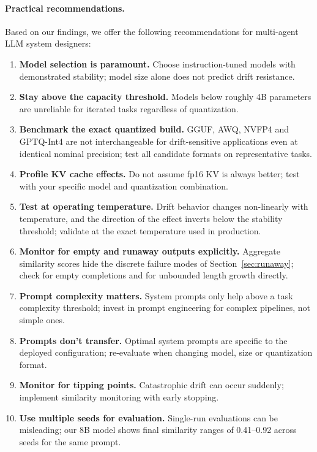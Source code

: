 \documentclass[11pt]{article}
\begin{document}
\paragraph{Practical recommendations.}
Based on our findings, we offer the following recommendations for multi-agent
LLM system designers:
\begin{enumerate}[leftmargin=*]
  \item \textbf{Model selection is paramount.} Choose instruction-tuned models
        with demonstrated stability; model size alone does not predict drift
        resistance.
  \item \textbf{Stay above the capacity threshold.} Models below roughly 4B
        parameters are unreliable for iterated tasks regardless of
        quantization.
  \item \textbf{Benchmark the exact quantized build.} GGUF, AWQ, NVFP4 and
        GPTQ-Int4 are not interchangeable for drift-sensitive applications
        even at identical nominal precision; test all candidate formats on
        representative tasks.
  \item \textbf{Profile KV cache effects.} Do not assume fp16 KV is always
        better; test with your specific model and quantization combination.
  \item \textbf{Test at operating temperature.} Drift behavior changes
        non-linearly with temperature, and the direction of the effect inverts
        below the stability threshold; validate at the exact temperature used
        in production.
  \item \textbf{Monitor for empty and runaway outputs explicitly.} Aggregate
        similarity scores hide the discrete failure modes of
        Section~\ref{sec:runaway}; check for empty completions and for
        unbounded length growth directly.
  \item \textbf{Prompt complexity matters.} System prompts only help above a
        task complexity threshold; invest in prompt engineering for complex
        pipelines, not simple ones.
  \item \textbf{Prompts don't transfer.} Optimal system prompts are specific to
        the deployed configuration; re-evaluate when changing model, size or
        quantization format.
  \item \textbf{Monitor for tipping points.} Catastrophic drift can occur
        suddenly; implement similarity monitoring with early stopping.
  \item \textbf{Use multiple seeds for evaluation.} Single-run evaluations
        can be misleading; our 8B model shows final similarity ranges of
        0.41--0.92 across seeds for the same prompt.
\end{enumerate}
\end{document}
